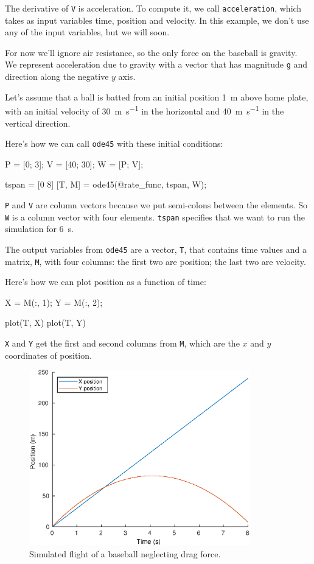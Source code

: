 \documentclass[
]{book}
\numberwithin{Answer}{chapter}
\numberwithin{Exercise}{chapter}
\begin{document}
The derivative of {\tt V} is acceleration.  To compute it, we call {\tt acceleration}, which takes as input variables time, position and velocity.  In this example, we don't use any of the input variables, but we will soon.

For now we'll ignore air resistance, so the only force on the baseball is gravity.  We represent acceleration due to gravity with a vector that has magnitude {\tt g} and direction along the negative $y$ axis.

Let's assume that a ball is batted from an initial position \SI{1}{\meter} above home plate, with an initial velocity of \SI{30}{\meter\per\second} in the horizontal and \SI{40}{\meter\per\second} in the vertical direction.

Here's how we can call {\tt ode45} with these initial conditions:
 
\begin{code}
    P = [0; 3];       %
    V = [40; 30];     %
    W = [P; V];       %
    
    tspan = [0 8]
    [T, M] = ode45(@rate_func, tspan, W);
\end{code}

{\tt P} and {\tt V} are column vectors because we put semi-colons between the elements.  So {\tt W} is a column vector with four elements.
{\tt tspan} specifies that we want to run the simulation for \SI{6}{\second}.

The output variables from {\tt ode45} are a vector, 
{\tt T}, that contains time values and a matrix, {\tt M}, with four columns: the first two are position; the last two are velocity.

Here's how we can plot position as a function of time:

\begin{code}
	X = M(:, 1);
    Y = M(:, 2);
    
    plot(T, X)
    plot(T, Y)
\end{code}

{\tt X} and {\tt Y} get the first and second columns from {\tt M}, which are the $x$ and $y$ coordinates of position.

\begin{figure}
\centerline{\includegraphics[height=3in]{figs/baseball1.eps}}
\caption{Simulated flight of a baseball neglecting drag force.}
\label{fig:baseball1}
\end{figure}
\end{document}
